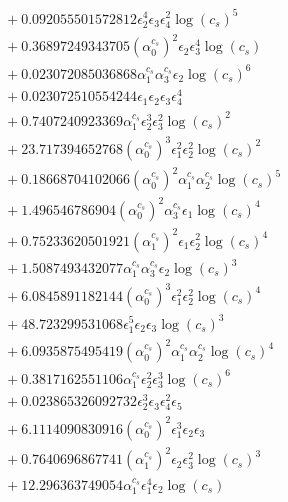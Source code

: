 \documentclass[10pt]{article}
\begin{document}
\begin{align*}
&{}  + 0.092055501572812 \epsilon_{2}^{4} \epsilon_{3} \epsilon_{4}^{2} \log{\left(c_{s} \right)}^{5} \\
&{}  + 0.36897249343705 \left(\alpha_{0}^{c_s}\right)^{2} \epsilon_{2} \epsilon_{3}^{4} \log{\left(c_{s} \right)} \\
&{}  + 0.023072085036868 \alpha_{1}^{c_s} \alpha_{3}^{c_s} \epsilon_{2} \log{\left(c_{s} \right)}^{6} \\
&{}  + 0.023072510554244 \epsilon_{1} \epsilon_{2} \epsilon_{3} \epsilon_{4}^{4} \\
&{}  + 0.7407240923369 \alpha_{1}^{c_s} \epsilon_{2}^{3} \epsilon_{3}^{2} \log{\left(c_{s} \right)}^{2} \\
&{}  + 23.717394652768 \left(\alpha_{0}^{c_s}\right)^{3} \epsilon_{1}^{2} \epsilon_{2}^{2} \log{\left(c_{s} \right)}^{2} \\
&{}  + 0.18668704102066 \left(\alpha_{0}^{c_s}\right)^{2} \alpha_{1}^{c_s} \alpha_{2}^{c_s} \log{\left(c_{s} \right)}^{5} \\
&{}  + 1.496546786904 \left(\alpha_{0}^{c_s}\right)^{2} \alpha_{3}^{c_s} \epsilon_{1} \log{\left(c_{s} \right)}^{4} \\
&{}  + 0.75233620501921 \left(\alpha_{1}^{c_s}\right)^{2} \epsilon_{1} \epsilon_{2}^{2} \log{\left(c_{s} \right)}^{4} \\
&{}  + 1.5087493432077 \alpha_{1}^{c_s} \alpha_{3}^{c_s} \epsilon_{2} \log{\left(c_{s} \right)}^{3} \\
&{}  + 6.0845891182144 \left(\alpha_{0}^{c_s}\right)^{3} \epsilon_{1}^{2} \epsilon_{2}^{2} \log{\left(c_{s} \right)}^{4} \\
&{}  + 48.723299531068 \epsilon_{1}^{5} \epsilon_{2} \epsilon_{3} \log{\left(c_{s} \right)}^{3} \\
&{}  + 6.0935875495419 \left(\alpha_{0}^{c_s}\right)^{2} \alpha_{1}^{c_s} \alpha_{2}^{c_s} \log{\left(c_{s} \right)}^{4} \\
&{}  + 0.3817162551106 \alpha_{1}^{c_s} \epsilon_{2}^{2} \epsilon_{3}^{3} \log{\left(c_{s} \right)}^{6} \\
&{}  + 0.023865326092732 \epsilon_{2}^{3} \epsilon_{3} \epsilon_{4}^{2} \epsilon_{5} \\
&{}  + 6.1114090830916 \left(\alpha_{0}^{c_s}\right)^{2} \epsilon_{1}^{3} \epsilon_{2} \epsilon_{3} \\
&{}  + 0.7640696867741 \left(\alpha_{1}^{c_s}\right)^{2} \epsilon_{2} \epsilon_{3}^{2} \log{\left(c_{s} \right)}^{3} \\
&{}  + 12.296363749054 \alpha_{1}^{c_s} \epsilon_{1}^{4} \epsilon_{2} \log{\left(c_{s} \right)} \\

\end{align*}
\end{document}
